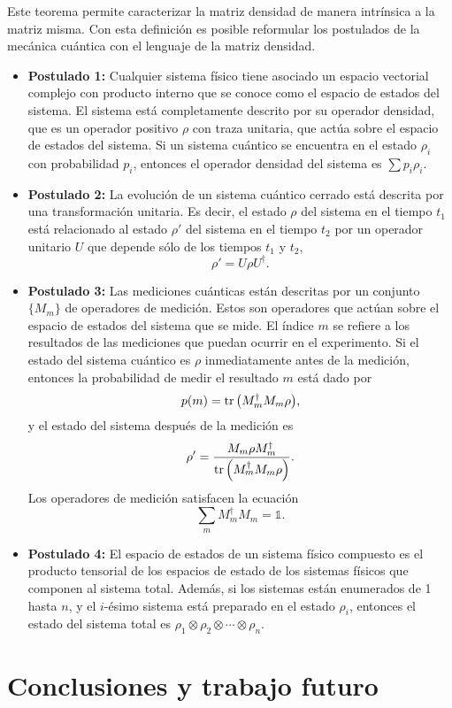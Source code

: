\documentclass[12pt]{report}
\begin{document}
Este teorema permite caracterizar la matriz densidad de manera intrínsica a la matriz misma. Con 
esta definición es posible reformular los postulados de la mecánica cuántica con el lenguaje de 
la matriz densidad. 
\begin{itemize}
	\item \textbf{Postulado 1:} Cualquier sistema físico tiene asociado un espacio vectorial complejo
								con producto interno que se conoce como el espacio de estados del
								sistema. El sistema está completamente descrito por su operador densidad,
								que es un operador positivo $\rho$ con traza unitaria, que actúa sobre 
								el espacio de estados del sistema. Si un sistema cuántico se encuentra
								en el estado $\rho _i$ con probabilidad $p_i$, entonces el operador densidad
								del sistema es $\sum p_i\rho_i$.
	\item \textbf{Postulado 2:} La evolución de un sistema cuántico cerrado está descrita por una transformación
								unitaria. Es decir, el estado $\rho$ del sistema en el tiempo $t_1$ está 
								relacionado al estado $\rho'$ del sistema en el tiempo $t_2$ por un operador
								unitario $U$ que depende sólo de los tiempos $t_1$ y $t_2$,
								\begin{equation}
								\rho'=U\rho U^{\dagger}.
								\label{eq:postulate1}
								\end{equation}
	\item \textbf{Postulado 3:} Las mediciones cuánticas están descritas por un conjunto $\{M_m\}$ de 
								operadores de medición. Estos son operadores que actúan sobre el espacio 
								de estados del sistema que se mide. El índice $m$ se refiere a los resultados
								de las mediciones que puedan ocurrir en el experimento. Si el estado del sistema
								cuántico es $\rho$ inmediatamente antes de la medición, entonces la probabilidad
								de medir el resultado $m$ está dado por
								\begin{equation}
								p(m)=\tr \qty(M_m^{\dagger}M_m\rho),
								\label{eq:postulate2_prob}
								\end{equation}						
								y el estado del sistema después de la medición es
								\begin{equation}
								\rho'=\frac{M_m\rho M_m^{\dagger}}{\tr \qty(M_m^{\dagger}M_m\rho)}.
								\label{eq:postulate2_rhoPrime}
								\end{equation}	
								Los operadores de medición satisfacen la ecuación 
								\begin{equation}
								\sum _m M_m^{\dagger}M_m=\mathbb{1}.
								\label{eq:postulate2_completeness}
								\end{equation}
	\item \textbf{Postulado 4:} El espacio de estados de un sistema físico compuesto es el producto tensorial 
								de los espacios de estado de los sistemas físicos que componen al sistema total.
								Además, si los sistemas están enumerados de 1 hasta $n$, y el $i$-ésimo sistema
								está preparado en el estado $\rho_i$, entonces el estado del sistema total es
								$\rho_1\otimes\rho_2\otimes\cdots\otimes\rho_n$.
\end{itemize}

\chapter{Conclusiones y trabajo futuro}





\end{document}
